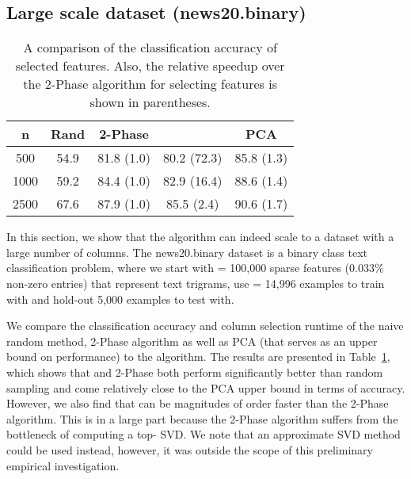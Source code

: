 \documentclass{article}
\begin{document}
\subsection{Large scale dataset (news20.binary)}

\begin{table}
\begin{small}
\begin{center}
  \begin{tabular}{|c|c|c|c|c|}
    \hline
    \bf n & \bf Rand & \bf 2-Phase & \bf  &  \bf PCA \\
    \hline
\hline
    500 & 54.9 & 81.8 (1.0) & 80.2 (72.3) & 85.8 (1.3) \\
    \hline
    1000 & 59.2 & 84.4 (1.0) & 82.9 (16.4) & 88.6 (1.4)\\
    \hline
    2500 & 67.6 & 87.9 (1.0) & 85.5 (2.4) & 90.6 (1.7) \\
    \hline
\end{tabular}
\end{center}
\vspace{-0.1cm}
\end{small}
  \caption{A comparison of the classification accuracy of selected features. Also, the relative speedup over the 2-Phase algorithm for selecting features is shown in parentheses.
\vspace{-0.4cm}
  }
\label{table}
\end{table}

In this section, we show that the  algorithm can indeed
scale to a dataset with a large number of columns.
The news20.binary dataset is a binary class text classification
problem, where we start with  = 100,000 sparse features (0.033\%
non-zero entries) that represent text trigrams, use  = 14,996
examples to train with and hold-out 5,000 examples to test with.

We compare the classification accuracy and column selection runtime of
the naive random method, 2-Phase algorithm
as well as PCA (that serves as an upper bound on performance)
to the  algorithm.
The results are presented in Table~\ref{table}, which shows that
 and 2-Phase both perform significantly better than random sampling and
come relatively close to the PCA upper bound in terms of accuracy. However,
we also find that  can be magnitudes of order faster than the 2-Phase
algorithm. This is in a large part because the 2-Phase algorithm suffers from the bottleneck of
computing a top- SVD. We note that an approximate SVD method
could be used instead,
however, it was outside the scope of this preliminary empirical investigation.
\end{document}
